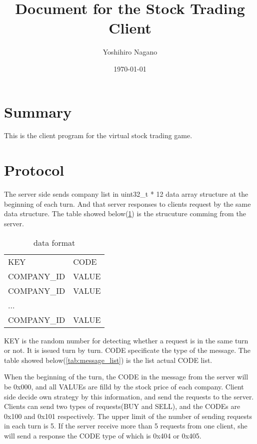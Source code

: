 \documentclass{article}
\title{
    Document for the Stock Trading Client
}
\author{
    Yoshihiro Nagano
}
\date{\today}
\newcommand{\tabref}[1]{\tablename\ref{#1}} %
\begin{document}
        \maketitle

        \section{Summary} %
        \label{sec:summary}

            This is the client program for the virtual stock trading game.



    \section{Protocol} %
    \label{sec:protocol}

        The server side sends company list in uint32\_t * 12 data array structure at the beginning of each turn.
        And that server responses to clients request by the same data structure.
        The table showed below(\tabref{tab:data_structure}) is the strucuture comming from the server.

        \begin{table}[h]
            \begin{center}
                \begin{tabular}{ll}
                KEY & CODE \\
                COMPANY\_ID & VALUE \\
                COMPANY\_ID & VALUE \\
                ... \\
                COMPANY\_ID & VALUE
                \end{tabular}
                \caption{data format}
                \label{tab:data_structure}
            \end{center}
        \end{table}

        KEY is the random number for detecting whether a request is in the same turn or not.
        It is issued turn by turn.
        CODE specificate the type of the message.
        The table showed below(\tabref{tab:message_list}) is the list actual CODE list.

        When the beginning of the turn,
        the CODE in the message from the server will be 0x000,
        and all VALUEs are filld by the stock price of each company.
        Client side decide own strategy by this information,
        and send the requests to the server.
        Clients can send two types of requests(BUY and SELL),
        and the CODEs are 0x100 and 0x101 respectively.
        The upper limit of the number of sending requests in each turn is 5.
        If the server receive more than 5 requests from one client,
        she will send a response the CODE type of which is 0x404 or 0x405.
\end{document}
